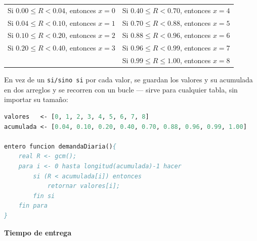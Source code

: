 \documentclass[12pt, a4paper]{article}
\begin{document}
\begin{description}
    \begin{center}
    \begin{tabular}{ll}
    Si $0.00 \leq R < 0.04$, entonces $x=0$ & Si $0.40 \leq R < 0.70$, entonces $x=4$ \\
    Si $0.04 \leq R < 0.10$, entonces $x=1$ & Si $0.70 \leq R < 0.88$, entonces $x=5$ \\
    Si $0.10 \leq R < 0.20$, entonces $x=2$ & Si $0.88 \leq R < 0.96$, entonces $x=6$ \\
    Si $0.20 \leq R < 0.40$, entonces $x=3$ & Si $0.96 \leq R < 0.99$, entonces $x=7$ \\
                                            & Si $0.99 \leq R \leq 1.00$, entonces $x=8$ \\
    \end{tabular}
    \end{center}

    \item[Paso 5: Propuesta algorítmica para la variable aleatoria]

    En vez de un \texttt{si/sino si} por cada valor, se guardan los valores y su acumulada en dos arreglos y se recorren con un bucle — sirve para cualquier tabla, sin importar su tamaño:

    \begin{lstlisting}[caption={demandaDiaria()}, language=Pascal]
valores   <- [0, 1, 2, 3, 4, 5, 6, 7, 8]
acumulada <- [0.04, 0.10, 0.20, 0.40, 0.70, 0.88, 0.96, 0.99, 1.00]

entero funcion demandaDiaria(){
    real R <- gcm();
    para i <- 0 hasta longitud(acumulada)-1 hacer
        si (R < acumulada[i]) entonces
            retornar valores[i];
        fin si
    fin para
}
    \end{lstlisting}
\end{description}

\textbf{Tiempo de entrega}
\end{document}

